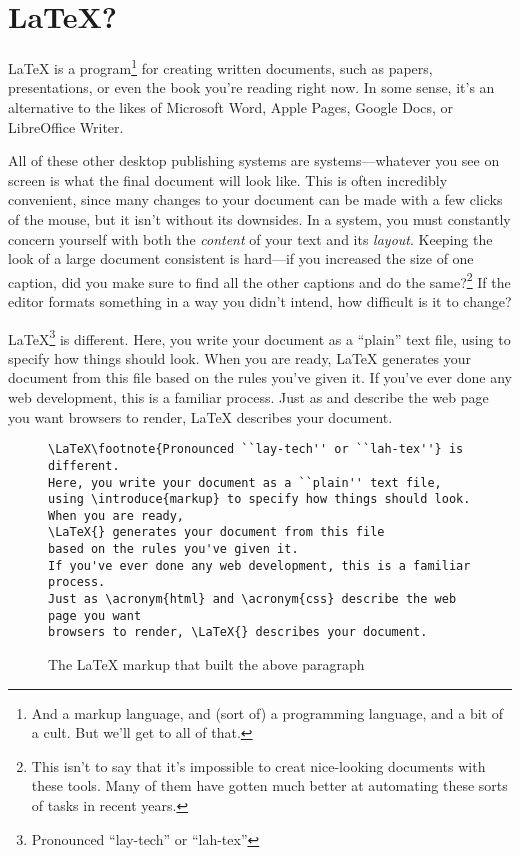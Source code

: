 \chapter{\texorpdfstring{\LaTeX}{LaTeX}?}

\LaTeX{} is a program\footnote{And a markup language,
and (sort of) a programming language, and a bit of a cult.
But we'll get to all of that.}
for creating written documents, such as papers, presentations,
or even the book you're reading right now.
In some sense, it's an alternative to the likes of Microsoft Word,
Apple Pages, Google Docs, or LibreOffice Writer.

All of these other desktop publishing systems are
  systems---whatever
you see on screen is what the final document will look like.
This is often incredibly convenient, since many changes to your document
can be made with a few clicks of the mouse,
but it isn't without its downsides.
In a  system,
you must constantly concern yourself with both
the \emph{content} of your text and its \emph{layout}.
Keeping the look of a large document consistent is hard---if you increased
the size of one caption, did you make sure to find all the other
captions and do the same?\footnote{This isn't to say that it's impossible
to creat nice-looking documents with these tools.
Many of them have gotten much better at automating these sorts of
tasks in recent years.}
If the editor formats something in a way you didn't intend,
how difficult is it to change?%

\LaTeX\footnote{Pronounced ``lay-tech'' or ``lah-tex''} is different.
Here, you write your document as a ``plain'' text file,
using  to specify how things should look.
When you are ready,
\LaTeX{} generates your document from this file
based on the rules you've given it.
If you've ever done any web development, this is a familiar process.
Just as  and  describe the web page you want
browsers to render, \LaTeX{} describes your document.

\begin{figure}[h]
\centering
\begin{lstlisting}
\LaTeX\footnote{Pronounced ``lay-tech'' or ``lah-tex''} is different.
Here, you write your document as a ``plain'' text file,
using \introduce{markup} to specify how things should look.
When you are ready,
\LaTeX{} generates your document from this file
based on the rules you've given it.
If you've ever done any web development, this is a familiar process.
Just as \acronym{html} and \acronym{css} describe the web page you want
browsers to render, \LaTeX{} describes your document.
\end{lstlisting}
\caption{The \LaTeX{} markup that built the above paragraph}
\end{figure}

